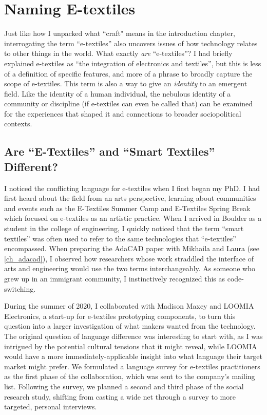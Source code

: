 \chapter{Naming E-textiles}
\label{ch_e-textiles}

Just like how I unpacked what ``craft" means in the introduction chapter, interrogating the term ``e-textiles'' also uncovers issues of how technology relates to other things in the world. What exactly \textit{are} ``e-textiles''? I had briefly explained e-textiles as ``the integration of electronics and textiles'', but this is less of a definition of specific features, and more of a phrase to broadly capture the scope of e-textiles. This term is also a way to give an \textit{identity} to an emergent field. Like the identity of a human individual, the nebulous identity of a community or discipline (if e-textiles can even be called that) can be examined for the experiences that shaped it and connections to broader sociopolitical contexts.

\section{Are ``E-Textiles'' and ``Smart Textiles'' Different?}
\label{sct_e-textiles_motivation}

I noticed the conflicting language for e-textiles when I first began my PhD. I had first heard about the field from an arts perspective, learning about communities and events such as the E-Textiles Summer Camp  and E-Textiles Spring Break which focused on e-textiles as an artistic practice. When I arrived in Boulder as a student in the college of engineering, I quickly noticed that the term ``smart textiles'' was often used to refer to the same technologies that ``e-textiles'' encompassed. When preparing the AdaCAD paper with Mikhaila and Laura (see \ref{ch_adacad}), I observed how researchers whose work straddled the interface of arts and engineering would use the two terms interchangeably. As someone who grew up in an immigrant community, I instinctively recognized this as code-switching.

During the summer of 2020, I collaborated with Madison Maxey and LOOMIA Electronics, a start-up for e-textiles prototyping components, to turn this question into a larger investigation of what makers wanted from the technology. The original question of language difference was interesting to start with, as I was intrigued by the potential cultural tensions that it might reveal, while LOOMIA would have a more immediately-applicable insight into what language their target market might prefer. We formulated a language survey for e-textiles practitioners as the first phase of the collaboration, which was sent to the company's mailing list.
Following the survey, we planned a second and third phase of the social research study, shifting from casting a wide net through a survey to more targeted, personal interviews.


